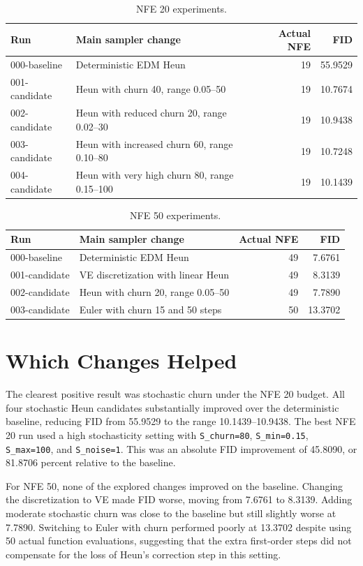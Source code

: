 \documentclass[11pt]{article}
\begin{document}
\begin{table}[h]
\centering
\caption{NFE 20 experiments.}
\begin{tabular}{llrr}
\toprule
Run & Main sampler change & Actual NFE & FID \\
\midrule
000-baseline & Deterministic EDM Heun & 19 & 55.9529 \\
001-candidate & Heun with churn 40, range 0.05--50 & 19 & 10.7674 \\
002-candidate & Heun with reduced churn 20, range 0.02--30 & 19 & 10.9438 \\
003-candidate & Heun with increased churn 60, range 0.10--80 & 19 & 10.7248 \\
004-candidate & Heun with very high churn 80, range 0.15--100 & 19 & 10.1439 \\
\bottomrule
\end{tabular}
\end{table}

\begin{table}[h]
\centering
\caption{NFE 50 experiments.}
\begin{tabular}{llrr}
\toprule
Run & Main sampler change & Actual NFE & FID \\
\midrule
000-baseline & Deterministic EDM Heun & 49 & 7.6761 \\
001-candidate & VE discretization with linear Heun & 49 & 8.3139 \\
002-candidate & Heun with churn 20, range 0.05--50 & 49 & 7.7890 \\
003-candidate & Euler with churn 15 and 50 steps & 50 & 13.3702 \\
\bottomrule
\end{tabular}
\end{table}

\section{Which Changes Helped}

The clearest positive result was stochastic churn under the NFE 20 budget. All four stochastic Heun candidates substantially improved over the deterministic baseline, reducing FID from 55.9529 to the range 10.1439--10.9438. The best NFE 20 run used a high stochasticity setting with \texttt{S\_churn=80}, \texttt{S\_min=0.15}, \texttt{S\_max=100}, and \texttt{S\_noise=1}. This was an absolute FID improvement of 45.8090, or 81.8706 percent relative to the baseline.

For NFE 50, none of the explored changes improved on the baseline. Changing the discretization to VE made FID worse, moving from 7.6761 to 8.3139. Adding moderate stochastic churn was close to the baseline but still slightly worse at 7.7890. Switching to Euler with churn performed poorly at 13.3702 despite using 50 actual function evaluations, suggesting that the extra first-order steps did not compensate for the loss of Heun's correction step in this setting.
\end{document}
